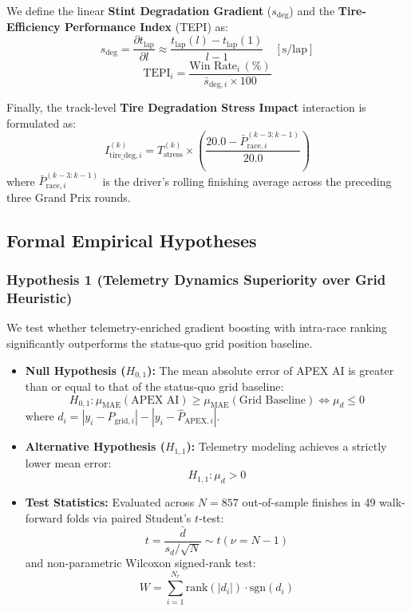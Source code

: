 \documentclass[journal]{IEEEtran}
\begin{document}
We define the linear \textbf{Stint Degradation Gradient} ($s_{\text{deg}}$) and the \textbf{Tire-Efficiency Performance Index} (TEPI) as:
\begin{equation}
s_{\text{deg}} = \frac{\partial t_{\text{lap}}}{\partial l} \approx \frac{t_{\text{lap}}(l) - t_{\text{lap}}(1)}{l - 1} \quad [\text{s/lap}]
\end{equation}
\begin{equation}
\text{TEPI}_i = \frac{\text{Win Rate}_i \,(\%)}{\bar{s}_{\text{deg}, i} \times 100}
\end{equation}

Finally, the track-level \textbf{Tire Degradation Stress Impact} interaction is formulated as:
\begin{equation}
I_{\text{tire\_deg}, i}^{(k)} = T_{\text{stress}}^{(k)} \times \left( \frac{20.0 - \bar{P}_{\text{race}, i}^{(k-3:k-1)}}{20.0} \right)
\label{eq:tire_deg_impact}
\end{equation}
where $\bar{P}_{\text{race}, i}^{(k-3:k-1)}$ is the driver's rolling finishing average across the preceding three Grand Prix rounds.

\subsection{Formal Empirical Hypotheses}

\subsubsection{Hypothesis 1 (Telemetry Dynamics Superiority over Grid Heuristic)}
We test whether telemetry-enriched gradient boosting with intra-race ranking significantly outperforms the status-quo grid position baseline.
\begin{itemize}
    \item \textbf{Null Hypothesis ($H_{0,1}$):} The mean absolute error of APEX AI is greater than or equal to that of the status-quo grid baseline:
    \begin{equation}
    H_{0,1}: \mu_{\text{MAE}}(\text{APEX AI}) \ge \mu_{\text{MAE}}(\text{Grid Baseline}) \iff \mu_d \le 0
    \end{equation}
    where $d_i = |y_i - P_{\text{grid}, i}| - |y_i - \hat{P}_{\text{APEX}, i}|$.
    \item \textbf{Alternative Hypothesis ($H_{1,1}$):} Telemetry modeling achieves a strictly lower mean error:
    \begin{equation}
    H_{1,1}: \mu_d > 0
    \end{equation}
    \item \textbf{Test Statistics:} Evaluated across $N = 857$ out-of-sample finishes in 49 walk-forward folds via paired Student's $t$-test:
    \begin{equation}
    t = \frac{\bar{d}}{s_d / \sqrt{N}} \sim t(\nu = N - 1)
    \end{equation}
    and non-parametric Wilcoxon signed-rank test:
    \begin{equation}
    W = \sum_{i=1}^{N_r} \text{rank}(|d_i|) \cdot \text{sgn}(d_i)
    \end{equation}
\end{itemize}
\end{document}
